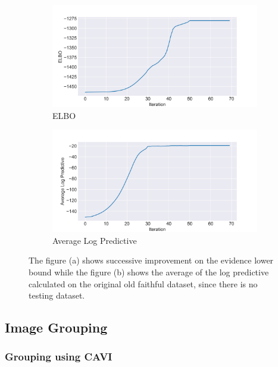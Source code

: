 \documentclass[letterpaper]{article}
\begin{document}
\begin{figure}[H]
  \centering
  \begin{subfigure}[b]{0.45\linewidth}
    \includegraphics[width=\linewidth]{outputs/old_faithful/elbo.png}
     \caption{ELBO}
  \end{subfigure}
  \begin{subfigure}[b]{0.45\linewidth}
    \includegraphics[width=\linewidth]{outputs/old_faithful/pred_density.png}
    \caption{Average Log Predictive}
  \end{subfigure}
  \caption{The figure (a) shows successive improvement on the evidence lower bound while the figure (b) shows the average of the log predictive calculated on the original old faithful dataset, since there is no testing dataset.}
\end{figure}

\subsection{Image Grouping}

\subsubsection{Grouping using CAVI}
\end{document}
